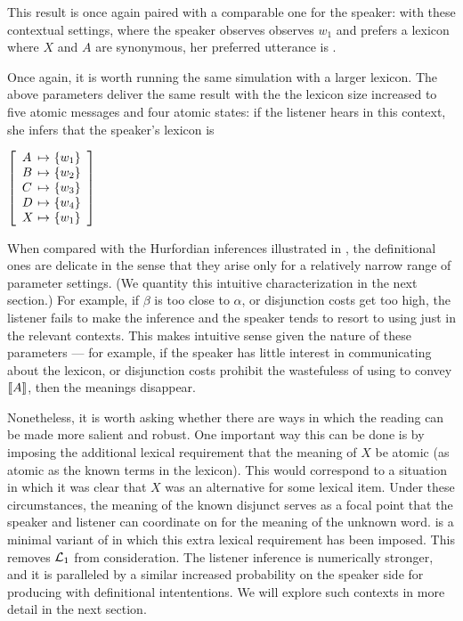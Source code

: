 \documentclass{article}
\begin{document}
This result is once again paired with a comparable one for the
speaker: with these contextual settings, where the speaker observes
observes $w_{1}$ and prefers a lexicon where $X$ and $A$ are
synonymous, her preferred utterance is .

Once again, it is worth running the same simulation with a larger
lexicon. The above parameters deliver the same result with the the
lexicon size increased to five atomic messages and four atomic states:
if the listener hears  in this context, she infers
that the speaker's lexicon is 
%
\begin{examples}
\item\label{def-lex-large}
  $\left[
    \begin{array}[c]{l@{ \ \mapsto \ }l}
      A & \set{w_{1}} \\
      B & \set{w_{2}} \\
      C & \set{w_{3}} \\
      D & \set{w_{4}} \\
      X & \set{w_{1}}
    \end{array}
  \right]$
\end{examples}

When compared with the Hurfordian inferences illustrated in
, the definitional ones are delicate
in the sense that they arise only for a relatively narrow range of
parameter settings. (We quantity this intuitive characterization in
the next section.) For example, if $\beta$ is too close to $\alpha$,
or disjunction costs get too high, the listener fails to make the
inference and the speaker tends to resort to using just  in
the relevant contexts. This makes intuitive sense given the nature of
these parameters --- for example, if the speaker has little interest
in communicating about the lexicon, or disjunction costs prohibit the
wastefuless of using  to convey $\llbracket A\rrbracket$, then the
meanings disappear. 

Nonetheless, it is worth asking whether there are ways in which the
reading can be made more salient and robust. One important way this
can be done is by imposing the additional lexical requirement that the
meaning of $X$ be atomic (as atomic as the known terms in the
lexicon). This would correspond to a situation in which it was clear
that $X$ was an alternative for some lexical item. Under these
circumstances, the meaning of the known disjunct serves as a focal
point \citep{Schelling60} that the speaker and listener can coordinate
on for the meaning of the unknown word.  is a
minimal variant of  in which this extra lexical
requirement has been imposed. This removes $\mathcal{L}_{1}$ from
consideration. The listener inference is numerically stronger, and it
is paralleled by a similar increased probability on the speaker side
for producing  with definitional intententions. We will
explore such contexts in more detail in the next section.
\end{document}
